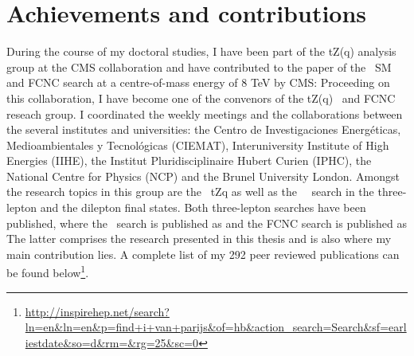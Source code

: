 \chapter*{Achievements and contributions}
During the course of my doctoral studies, I have been part of the tZ(q) analysis group at the CMS collaboration and have contributed to the paper of the \tZq\ SM and FCNC search at a centre-of-mass energy of 8 TeV by CMS: 
\vspace{+2ex}
\vspace{-2ex}
Proceeding on this collaboration, I have become one of the convenors of the tZ(q) \SM\ and FCNC reseach group. I coordinated the weekly meetings and the collaborations between the several institutes and universities: the Centro de Investigaciones Energ\'eticas, Medioambientales y Tecnol\'ogicas (CIEMAT), Interuniversity Institute of High Energies (IIHE), the Institut Pluridisciplinaire Hubert Curien (IPHC), the National Centre for Physics (NCP) and the Brunel University London. Amongst the research topics in this group are the \SM\ tZq as well as the \FCNC\ \tZq\ search in the three-lepton and the dilepton final states. Both three-lepton searches have been published, where the \SM\ search is published as
\vspace{+2ex}
\vspace{-2ex}
and the FCNC search is published as
\vspace{+2ex}
\vspace{-2ex}
The latter comprises the research presented in this thesis and is also where my main contribution lies. A complete list of my 292 peer reviewed publications can be found below\footnote{\url{http://inspirehep.net/search?ln=en&ln=en&p=find+i+van+parijs&of=hb&action_search=Search&sf=earliestdate&so=d&rm=&rg=25&sc=0}}.

